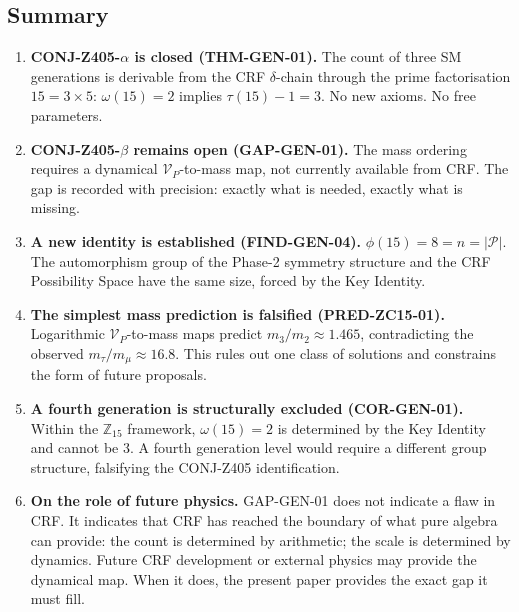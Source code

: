 \documentclass[12pt, a4paper]{article}
\begin{document}
\subsection{Summary}
\label{zc15:sec:summary}

\begin{enumerate}[leftmargin=*]

\item \textbf{CONJ-Z405-$\alpha$ is closed (THM-GEN-01).}
  The count of three SM generations is derivable from the
  CRF $\delta$-chain through the prime factorisation
  $15 = 3 \times 5$: $\omega(15)=2$ implies $\tau(15)-1=3$.
  No new axioms. No free parameters.

\item \textbf{CONJ-Z405-$\beta$ remains open (GAP-GEN-01).}
  The mass ordering requires a dynamical $\mathcal{V}_P$-to-mass
  map, not currently available from CRF. The gap is recorded with
  precision: exactly what is needed, exactly what is missing.

\item \textbf{A new identity is established (FIND-GEN-04).}
  $\phi(15) = 8 = n = |\mathcal{P}|$. The automorphism group of
  the Phase-2 symmetry structure and the CRF Possibility Space
  have the same size, forced by the Key Identity.

\item \textbf{The simplest mass prediction is falsified
  (PRED-ZC15-01).}
  Logarithmic $\mathcal{V}_P$-to-mass maps predict
  $m_3/m_2 \approx 1.465$, contradicting the observed
  $m_\tau/m_\mu \approx 16.8$. This rules out one class of
  solutions and constrains the form of future proposals.

\item \textbf{A fourth generation is structurally excluded
  (COR-GEN-01).}
  Within the $\mathbb{Z}_{15}$ framework, $\omega(15)=2$ is
  determined by the Key Identity and cannot be 3. A fourth
  generation level would require a different group structure,
  falsifying the CONJ-Z405 identification.

\item \textbf{On the role of future physics.}
  GAP-GEN-01 does not indicate a flaw in CRF. It indicates
  that CRF has reached the boundary of what pure algebra can
  provide: the count is determined by arithmetic; the scale is
  determined by dynamics. Future CRF development or external
  physics may provide the dynamical map. When it does, the
  present paper provides the exact gap it must fill.

\end{enumerate}
\end{document}
